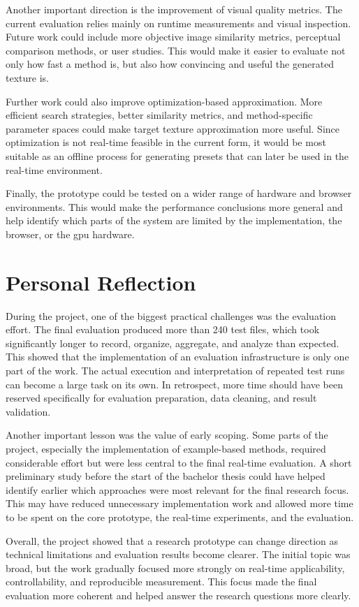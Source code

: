 Another important direction is the improvement of visual quality metrics. The current evaluation relies mainly on runtime measurements and visual inspection. Future work could include more objective image similarity metrics, perceptual comparison methods, or user studies. This would make it easier to evaluate not only how fast a method is, but also how convincing and useful the generated texture is.

Further work could also improve optimization-based approximation. More efficient search strategies, better similarity metrics, and method-specific parameter spaces could make target texture approximation more useful. Since optimization is not real-time feasible in the current form, it would be most suitable as an offline process for generating presets that can later be used in the real-time environment.

Finally, the prototype could be tested on a wider range of hardware and browser environments. This would make the performance conclusions more general and help identify which parts of the system are limited by the implementation, the browser, or the \gls{gpu} hardware.

\section{Personal Reflection}

During the project, one of the biggest practical challenges was the evaluation effort. The final evaluation produced more than 240 test files, which took significantly longer to record, organize, aggregate, and analyze than expected. This showed that the implementation of an evaluation infrastructure is only one part of the work. The actual execution and interpretation of repeated test runs can become a large task on its own. In retrospect, more time should have been reserved specifically for evaluation preparation, data cleaning, and result validation.

Another important lesson was the value of early scoping. Some parts of the project, especially the implementation of example-based methods, required considerable effort but were less central to the final real-time evaluation. A short preliminary study before the start of the bachelor thesis could have helped identify earlier which approaches were most relevant for the final research focus. This may have reduced unnecessary implementation work and allowed more time to be spent on the core prototype, the real-time experiments, and the evaluation.

Overall, the project showed that a research prototype can change direction as technical limitations and evaluation results become clearer. The initial topic was broad, but the work gradually focused more strongly on real-time applicability, controllability, and reproducible measurement. This focus made the final evaluation more coherent and helped answer the research questions more clearly.